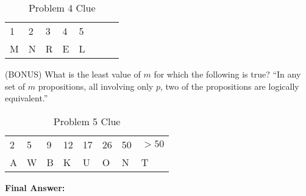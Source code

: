 \documentclass[solution, letterpaper]{cs20inclass}
\begin{document}
\begin{table}[h]
\centering
\begin{tabular}{llllllll}
1 & 2 & 3 & 4 & 5 \\
M & N & R & E & L
\end{tabular}
\caption*{Problem 4 Clue}
\end{table}

\begin{solution}
\end{solution}

\problem (BONUS) What is the least value of $m$ for which the following is true? ``In any set of $m$ propositions, all involving only $p$, two of the propositions are logically equivalent.''

\begin{table}[h]
\centering
\begin{tabular}{llllllll}
2 & 5 & 9 & 12 & 17 & 26 & 50 & $>50$ \\
A & W & B & K & U & O & N & T
\end{tabular}
\caption*{Problem 5 Clue}
\end{table}

\begin{solution}
\end{solution}

\problem \textbf{Final Answer: }

\begin{solution}
\end{solution}
\end{document}
